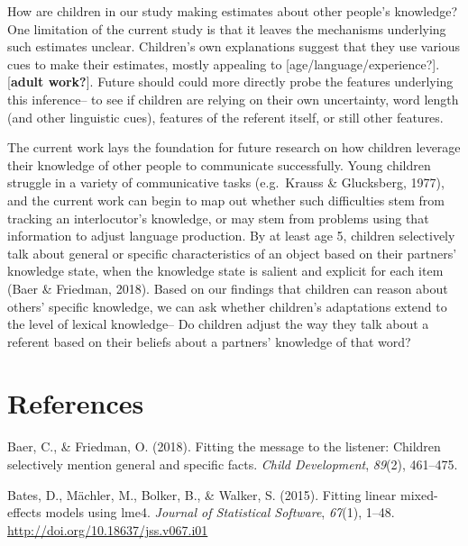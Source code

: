 \documentclass[10pt, letterpaper]{article}
\begin{document}
How are children in our study making estimates about other people's
knowledge? One limitation of the current study is that it leaves the
mechanisms underlying such estimates unclear. Children's own
explanations suggest that they use various cues to make their estimates,
mostly appealing to {[}age/language/experience?{]}. {[}\textbf{adult
work?}{]}. Future should could more directly probe the features
underlying this inference-- to see if children are relying on their own
uncertainty, word length (and other linguistic cues), features of the
referent itself, or still other features.

The current work lays the foundation for future research on how children
leverage their knowledge of other people to communicate successfully.
Young children struggle in a variety of communicative tasks (e.g.~Krauss
\& Glucksberg, 1977), and the current work can begin to map out whether
such difficulties stem from tracking an interlocutor's knowledge, or may
stem from problems using that information to adjust language production.
By at least age 5, children selectively talk about general or specific
characteristics of an object based on their partners' knowledge state,
when the knowledge state is salient and explicit for each item (Baer \&
Friedman, 2018). Based on our findings that children can reason about
others' specific knowledge, we can ask whether children's adaptations
extend to the level of lexical knowledge-- Do children adjust the way
they talk about a referent based on their beliefs about a partners'
knowledge of that word?

\vspace{1em} 

\hypertarget{references}{%
\section{References}\label{references}}

\setlength{\parindent}{-0.1in} 
\setlength{\leftskip}{0.125in}

\noindent

\hypertarget{refs}{}
\leavevmode\hypertarget{ref-baer2018}{}%
Baer, C., \& Friedman, O. (2018). Fitting the message to the listener:
Children selectively mention general and specific facts. \emph{Child
Development}, \emph{89}(2), 461--475.

\leavevmode\hypertarget{ref-bates2015}{}%
Bates, D., Mächler, M., Bolker, B., \& Walker, S. (2015). Fitting linear
mixed-effects models using lme4. \emph{Journal of Statistical Software},
\emph{67}(1), 1--48. \url{http://doi.org/10.18637/jss.v067.i01}
\end{document}
